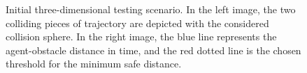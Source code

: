 \begin{figure}[!t]
\begin{center}
\begin{minipage}{.45\linewidth}
		\end{minipage}
	\end{center}
	\caption{Initial three-dimensional testing scenario. In the left image, the two colliding pieces of
    trajectory are depicted with the considered collision sphere. In the right image, the blue line represents the
    agent-obstacle distance in time, and the red dotted line is the chosen threshold for the minimum safe distance.}%
    \label{FIG:ST-BEZIER-3D-INITIAL}
\end{figure}
\begin{figure}[!t]
	\begin{center}
		\begin{minipage}{.45\linewidth}
			\centering
		\end{minipage}
		\begin{minipage}{.45\linewidth}
			\centering

\end{minipage}
\end{center}
\end{figure}
